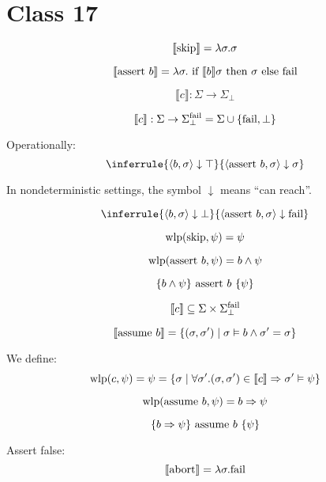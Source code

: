 {{%

\newcommand*{\vor}{{\;\setlength{\fboxsep}{0pt}\fbox{\phantom{l}}\;}}

\chapter{Class 17}

$$ \llbracket \textup{skip} \rrbracket = \lambda \sigma . \sigma $$

$$ \llbracket \textup{assert } b \rrbracket = \lambda \sigma . \textup{ if } \llbracket b \rrbracket \sigma 
\textup{ then } \sigma \textup{ else fail} $$

$$ \llbracket c \rrbracket : \Sigma \rightarrow \Sigma_\bot $$

$$ \llbracket c \rrbracket : \Sigma \rightarrow \Sigma_\bot^\textup{fail} = \Sigma \cup \{ \textup{fail}, \bot \} $$

Operationally:
$$\inferrule
{ \langle b, \sigma \rangle \downarrow \top }
{ \langle \textup{assert } b, \sigma \rangle \downarrow \sigma }
$$

In nondeterministic settings, the symbol $\downarrow$ means ``can reach''.

$$\inferrule
{ \langle b, \sigma \rangle \downarrow \bot }
{ \langle \textup{assert } b, \sigma \rangle \downarrow \textup{fail} }
$$

$$ \textup{wlp} ( \textup{skip}, \psi ) = \psi $$

$$ \textup{wlp} ( \textup{assert } b, \psi) = b \wedge \psi $$

$$ \{ b \wedge \psi \} \textup{ assert } b~ \{ \psi \} $$

$$ \llbracket c \rrbracket \subseteq \Sigma \times \Sigma_\bot^\textup{fail} $$

$$ \llbracket \textup{assume } b \rrbracket = \{ (\sigma, \sigma') \;|\; \sigma \vDash b \wedge \sigma' = \sigma \} $$

We define:
$$ \textup{wlp} ( c, \psi ) = \psi = \{ \sigma \;|\; \forall \sigma'. (\sigma, \sigma') \in 
\llbracket c \rrbracket \implies \sigma' \vDash \psi \} $$

$$ \textup{wlp} ( \textup{assume } b, \psi) = b \implies \psi $$

$$ \{ b \implies \psi \} \textup{ assume } b~ \{ \psi \} $$

Assert false:
$$ \llbracket \textup{abort} \rrbracket = \lambda \sigma . \textup{fail} $$

}}
